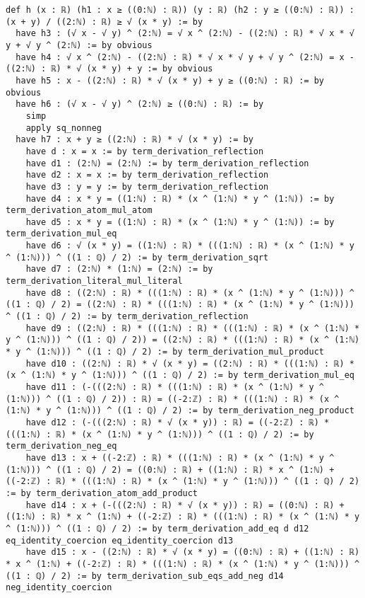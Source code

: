 \documentclass{article}
\begin{document}
\begin{tcolorbox}[colback=white!10, width=\linewidth]
\begin{lstlisting}[language=Lean4]
def h (x : ℝ) (h1 : x ≥ ((0:ℕ) : ℝ)) (y : ℝ) (h2 : y ≥ ((0:ℕ) : ℝ)) : (x + y) / ((2:ℕ) : ℝ) ≥ √ (x * y) := by
  have h3 : (√ x - √ y) ^ (2:ℕ) = √ x ^ (2:ℕ) - ((2:ℕ) : ℝ) * √ x * √ y + √ y ^ (2:ℕ) := by obvious
  have h4 : √ x ^ (2:ℕ) - ((2:ℕ) : ℝ) * √ x * √ y + √ y ^ (2:ℕ) = x - ((2:ℕ) : ℝ) * √ (x * y) + y := by obvious
  have h5 : x - ((2:ℕ) : ℝ) * √ (x * y) + y ≥ ((0:ℕ) : ℝ) := by obvious
  have h6 : (√ x - √ y) ^ (2:ℕ) ≥ ((0:ℕ) : ℝ) := by
    simp
    apply sq_nonneg
  have h7 : x + y ≥ ((2:ℕ) : ℝ) * √ (x * y) := by
    have d : x = x := by term_derivation_reflection
    have d1 : (2:ℕ) = (2:ℕ) := by term_derivation_reflection
    have d2 : x = x := by term_derivation_reflection
    have d3 : y = y := by term_derivation_reflection
    have d4 : x * y = ((1:ℕ) : ℝ) * (x ^ (1:ℕ) * y ^ (1:ℕ)) := by term_derivation_atom_mul_atom
    have d5 : x * y = ((1:ℕ) : ℝ) * (x ^ (1:ℕ) * y ^ (1:ℕ)) := by term_derivation_mul_eq
    have d6 : √ (x * y) = ((1:ℕ) : ℝ) * (((1:ℕ) : ℝ) * (x ^ (1:ℕ) * y ^ (1:ℕ))) ^ ((1 : ℚ) / 2) := by term_derivation_sqrt
    have d7 : (2:ℕ) * (1:ℕ) = (2:ℕ) := by term_derivation_literal_mul_literal
    have d8 : ((2:ℕ) : ℝ) * (((1:ℕ) : ℝ) * (x ^ (1:ℕ) * y ^ (1:ℕ))) ^ ((1 : ℚ) / 2) = ((2:ℕ) : ℝ) * (((1:ℕ) : ℝ) * (x ^ (1:ℕ) * y ^ (1:ℕ))) ^ ((1 : ℚ) / 2) := by term_derivation_reflection
    have d9 : ((2:ℕ) : ℝ) * (((1:ℕ) : ℝ) * (((1:ℕ) : ℝ) * (x ^ (1:ℕ) * y ^ (1:ℕ))) ^ ((1 : ℚ) / 2)) = ((2:ℕ) : ℝ) * (((1:ℕ) : ℝ) * (x ^ (1:ℕ) * y ^ (1:ℕ))) ^ ((1 : ℚ) / 2) := by term_derivation_mul_product
    have d10 : ((2:ℕ) : ℝ) * √ (x * y) = ((2:ℕ) : ℝ) * (((1:ℕ) : ℝ) * (x ^ (1:ℕ) * y ^ (1:ℕ))) ^ ((1 : ℚ) / 2) := by term_derivation_mul_eq
    have d11 : (-(((2:ℕ) : ℝ) * (((1:ℕ) : ℝ) * (x ^ (1:ℕ) * y ^ (1:ℕ))) ^ ((1 : ℚ) / 2)) : ℝ) = ((-2:ℤ) : ℝ) * (((1:ℕ) : ℝ) * (x ^ (1:ℕ) * y ^ (1:ℕ))) ^ ((1 : ℚ) / 2) := by term_derivation_neg_product
    have d12 : (-(((2:ℕ) : ℝ) * √ (x * y)) : ℝ) = ((-2:ℤ) : ℝ) * (((1:ℕ) : ℝ) * (x ^ (1:ℕ) * y ^ (1:ℕ))) ^ ((1 : ℚ) / 2) := by term_derivation_neg_eq
    have d13 : x + ((-2:ℤ) : ℝ) * (((1:ℕ) : ℝ) * (x ^ (1:ℕ) * y ^ (1:ℕ))) ^ ((1 : ℚ) / 2) = ((0:ℕ) : ℝ) + ((1:ℕ) : ℝ) * x ^ (1:ℕ) + ((-2:ℤ) : ℝ) * (((1:ℕ) : ℝ) * (x ^ (1:ℕ) * y ^ (1:ℕ))) ^ ((1 : ℚ) / 2) := by term_derivation_atom_add_product
    have d14 : x + (-(((2:ℕ) : ℝ) * √ (x * y)) : ℝ) = ((0:ℕ) : ℝ) + ((1:ℕ) : ℝ) * x ^ (1:ℕ) + ((-2:ℤ) : ℝ) * (((1:ℕ) : ℝ) * (x ^ (1:ℕ) * y ^ (1:ℕ))) ^ ((1 : ℚ) / 2) := by term_derivation_add_eq d d12 eq_identity_coercion eq_identity_coercion d13
    have d15 : x - ((2:ℕ) : ℝ) * √ (x * y) = ((0:ℕ) : ℝ) + ((1:ℕ) : ℝ) * x ^ (1:ℕ) + ((-2:ℤ) : ℝ) * (((1:ℕ) : ℝ) * (x ^ (1:ℕ) * y ^ (1:ℕ))) ^ ((1 : ℚ) / 2) := by term_derivation_sub_eqs_add_neg d14 neg_identity_coercion

\end{lstlisting}
\end{tcolorbox}
\end{document}
